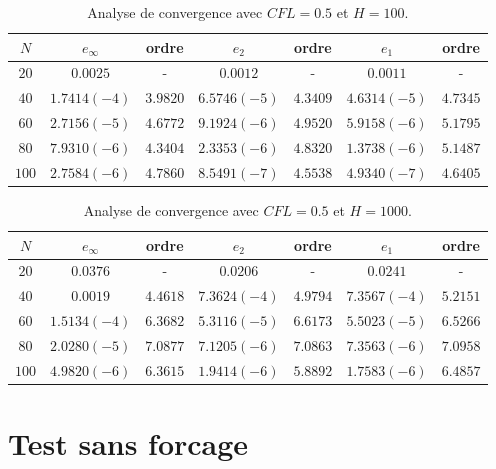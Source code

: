 \begin{table}[ht]
\begin{center}
\begin{tabular}{c|c|c|c|c|c|c}
$N$ & $e_{\infty}$ & ordre & $e_2$ & ordre & $e_1$ & ordre \\ 
\hline 
\hline
$20$ & $0.0025$ & - & $0.0012$ & - & $0.0011$ & - \\ 
\hline 
$40$ & $1.7414 (-4)$ & $3.9820$ & $6.5746 (-5)$ & $4.3409$ & $4.6314 (-5)$ & $4.7345$ \\ 
\hline 
$60$ & $2.7156 (-5)$ & $4.6772$ & $9.1924 (-6)$ & $4.9520$ & $5.9158 (-6)$ & $5.1795$ \\
\hline 
$80$ & $7.9310 (-6)$ & $4.3404$ & $2.3353 (-6)$ & $4.8320$ & $1.3738 (-6)$ & $5.1487$ \\ 
\hline 
$100$ & $2.7584(-6)$ & $4.7860$ & $8.5491 (-7)$ & $4.5538$ & $4.9340 (-7)$ & $4.6405$  \\ 
\end{tabular} 
\caption{Analyse de convergence avec $CFL=0.5$ et $H=100$.}
\label{CV_order8_hp100}
\end{center}
\end{table}


\begin{table}[ht]
\begin{center}
\begin{tabular}{c|c|c|c|c|c|c}
$N$ & $e_{\infty}$ & ordre & $e_2$ & ordre & $e_1$ & ordre \\ 
\hline 
\hline
$20$ & $0.0376$ & - & $0.0206$ & - & $0.0241$ & - \\ 
\hline 
$40$ & $0.0019$ & $4.4618$ & $7.3624 (-4)$ & $4.9794$ & $7.3567 (-4)$ & $5.2151$ \\ 
\hline 
$60$ & $1.5134 (-4)$ & $6.3682$ & $5.3116 (-5)$ & $6.6173$ & $5.5023 (-5)$ & $6.5266$ \\
\hline 
$80$ & $2.0280 (-5)$ & $7.0877$ & $7.1205 (-6)$ & $7.0863$ & $7.3563 (-6)$ & $7.0958$ \\ 
\hline 
$100$ & $4.9820(-6)$ & $6.3615$ & $1.9414 (-6)$ & $5.8892$ & $1.7583 (-6)$ & $6.4857$  \\ 
\end{tabular} 
\caption{Analyse de convergence avec $CFL=0.5$ et $H=1000$.}
\label{CV_order8_hp1000}
\end{center}
\end{table}


\section{Test sans forcage}


